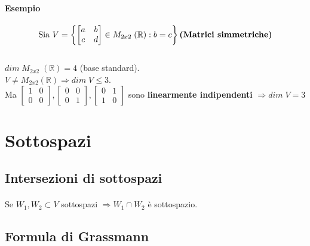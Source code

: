 \documentclass[a4paper, 12pt]{report}
\begin{document}
                \paragraph{Esempio}
                $$
                \text{Sia }
                V=\left \{
                \begin{bmatrix}
                    a & b\\
                    c & d
                \end{bmatrix}
                \in M_{2x2} \; (\mathbb{R}):b=c \right \}
                \text{\textbf{(Matrici simmetriche)}}
                $$\\
                $dim \; M_{2x2} \; (\mathbb{R})=4$ (base standard).\\[4px]
                $V \neq M_{2x2}(\mathbb{R}) \Rightarrow dim \; V \leq 3$.\\[4px]
                Ma 
                $
                \begin{bmatrix}
                    1 & 0\\
                    0 & 0
                \end{bmatrix}
                ,
                \begin{bmatrix}
                    0 & 0\\
                    0 & 1
                \end{bmatrix}
                ,
                \begin{bmatrix}
                    0 & 1\\
                    1 & 0
                \end{bmatrix}
                $ sono \textbf{linearmente indipendenti} $\Rightarrow dim \; V=3$
        \section{Sottospazi}
            \subsection{Intersezioni di sottospazi}
                \paragraph{}Se $W_1,W_2 \subset V$ sottospazi $\Rightarrow W_1 \cap W_2$ è sottospazio.
            \subsection{Formula di Grassmann}
\end{document}
